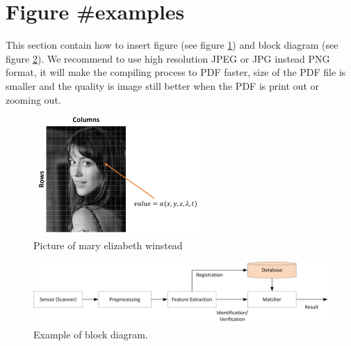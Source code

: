 \section{Figure \#examples}
This section contain how to insert figure (see figure \ref{fig:digital}) and block diagram (see figure \ref{blo:biometrics}). We recommend to use high resolution JPEG or JPG instead PNG format, it will make the compiling process to PDF faster, size of the PDF file is smaller and the quality is image still better when the PDF is print out or zooming out.
	\begin{figure}[H]
		\centering
		\includegraphics[width=2.5in]{figure/fig_digital}
		\caption{Picture of mary elizabeth winstead}
		\label{fig:digital}
	\end{figure}	
	\begin{figure}[H]
		\centering
		\includegraphics[width=5.5in]{block/gen_biometrics}
		\caption{Example of block diagram.}
		\label{blo:biometrics}
	\end{figure}	
	
